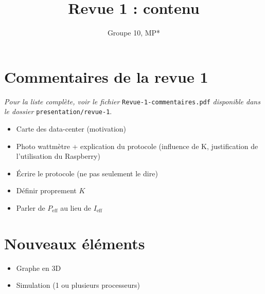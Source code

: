\documentclass[french]{article}
\title{Revue 1 : contenu}
\author{Groupe 10, MP*}
\begin{document}
\maketitle

\section{Commentaires de la revue 1}

\textit{Pour la liste complète, voir le fichier} \texttt{Revue-1-commentaires.pdf} \textit{disponible dans le dossier} \texttt{presentation/revue-1}.

\begin{itemize}
    \item Carte des data-center (motivation)
    \item Photo wattmètre + explication du protocole (influence de K, justification de l'utilisation du Raspberry)
    \item Écrire le protocole (ne pas seulement le dire)
    \item Définir proprement $K$
    \item Parler de $P_\text{eff}$ au lieu de $I_\text{eff}$
\end{itemize}

\section{Nouveaux éléments}

\begin{itemize}
    \item Graphe en 3D
    \item Simulation (1 ou plusieurs processeurs)
\end{itemize}
\end{document}
